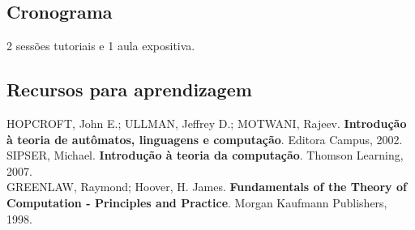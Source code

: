 \subsection{Cronograma}

2 sessões tutoriais e 1 aula expositiva.

\subsection{\large{Recursos para aprendizagem}}

\noindent
HOPCROFT, John E.; ULLMAN, Jeffrey D.; MOTWANI, Rajeev. \textbf{Introdução à teoria de autômatos, linguagens e computação}. Editora Campus, 2002.\\

\noindent
SIPSER, Michael. \textbf{Introdução à teoria da computação}. Thomson Learning, 2007.\\

\noindent
GREENLAW, Raymond; Hoover, H. James. \textbf{Fundamentals of the Theory of Computation - Principles and Practice}. Morgan Kaufmann Publishers, 1998.\\


